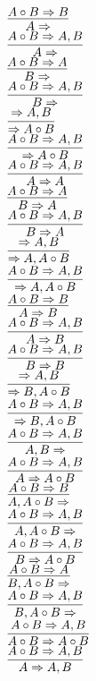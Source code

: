 \documentclass[11pt]{article}
\begin{document}
\begin{center}

$\infer{A\Rightarrow }{A\circ B\Rightarrow B}$
\bigskip
\\$\infer{A\Rightarrow }{A\circ B\Rightarrow A, B}$
\bigskip
\\$\infer{B\Rightarrow }{A\circ B\Rightarrow A}$
\bigskip
\\$\infer{B\Rightarrow }{A\circ B\Rightarrow A, B}$
\bigskip
\\$\infer{\Rightarrow A\circ B}{\Rightarrow A, B}$
\bigskip
\\$\infer{\Rightarrow A\circ B}{A\circ B\Rightarrow A, B}$
\bigskip
\\$\infer{A\Rightarrow A}{A\circ B\Rightarrow A, B}$
\bigskip
\\$\infer{B\Rightarrow A}{A\circ B\Rightarrow A}$
\bigskip
\\$\infer{B\Rightarrow A}{A\circ B\Rightarrow A, B}$
\bigskip
\\$\infer{\Rightarrow A, A\circ B}{\Rightarrow A, B}$
\bigskip
\\$\infer{\Rightarrow A, A\circ B}{A\circ B\Rightarrow A, B}$
\bigskip
\\$\infer{A\Rightarrow B}{A\circ B\Rightarrow B}$
\bigskip
\\$\infer{A\Rightarrow B}{A\circ B\Rightarrow A, B}$
\bigskip
\\$\infer{B\Rightarrow B}{A\circ B\Rightarrow A, B}$
\bigskip
\\$\infer{\Rightarrow B, A\circ B}{\Rightarrow A, B}$
\bigskip
\\$\infer{\Rightarrow B, A\circ B}{A\circ B\Rightarrow A, B}$
\bigskip
\\$\infer{A, B\Rightarrow }{A\circ B\Rightarrow A, B}$
\bigskip
\\$\infer{A\Rightarrow A\circ B}{A\circ B\Rightarrow A, B}$
\bigskip
\\$\infer{A, A\circ B\Rightarrow }{A\circ B\Rightarrow B}$
\bigskip
\\$\infer{A, A\circ B\Rightarrow }{A\circ B\Rightarrow A, B}$
\bigskip
\\$\infer{B\Rightarrow A\circ B}{A\circ B\Rightarrow A, B}$
\bigskip
\\$\infer{B, A\circ B\Rightarrow }{A\circ B\Rightarrow A}$
\bigskip
\\$\infer{B, A\circ B\Rightarrow }{A\circ B\Rightarrow A, B}$
\bigskip
\\$\infer{A\circ B\Rightarrow A\circ B}{A\circ B\Rightarrow A, B}$
\bigskip
\\$\infer{A\Rightarrow A, B}{A\circ B\Rightarrow A, B}$

\end{center}
\end{document}
